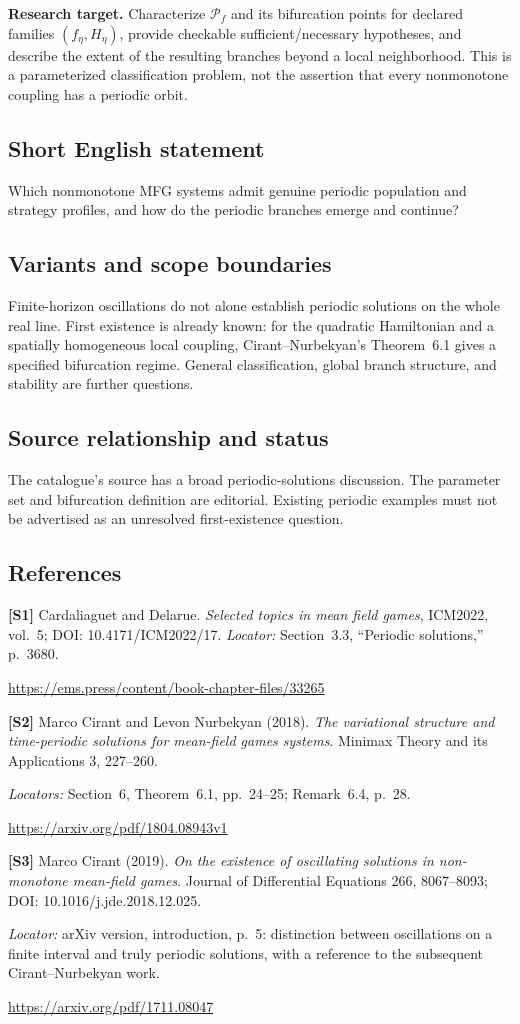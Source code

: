 \documentclass[11pt,a4paper]{article}
\begin{document}
\textbf{Research target.} Characterize $\mathcal P_f$ and its bifurcation points for declared families $(f_\eta,H_\eta)$, provide checkable sufficient/necessary hypotheses, and describe the extent of the resulting branches beyond a local neighborhood. This is a parameterized classification problem, not the assertion that every nonmonotone coupling has a periodic orbit.
\subsection*{Short English statement}
Which nonmonotone MFG systems admit genuine periodic population and strategy profiles, and how do the periodic branches emerge and continue?
\subsection*{Variants and scope boundaries}
Finite-horizon oscillations do not alone establish periodic solutions on the whole real line. First existence is already known: for the quadratic Hamiltonian and a spatially homogeneous local coupling, Cirant--Nurbekyan's Theorem~6.1 gives a specified bifurcation regime. General classification, global branch structure, and stability are further questions.
\subsection*{Source relationship and status}
The catalogue's source has a broad periodic-solutions discussion. The parameter set and bifurcation definition are editorial. Existing periodic examples must not be advertised as an unresolved first-existence question.
\subsection*{References}
\begingroup\footnotesize\raggedright
{\footnotesize\raggedright
\textbf{[S1]} Cardaliaguet and Delarue. \emph{Selected topics in mean field games}, ICM2022, vol.~5; DOI: 10.4171/ICM2022/17. \textit{Locator:} Section~3.3, ``Periodic solutions,'' p.~3680.\par
\url{https://ems.press/content/book-chapter-files/33265}\par\smallskip
\textbf{[S2]} Marco Cirant and Levon Nurbekyan (2018). \emph{The variational structure and time-periodic solutions for mean-field games systems}. Minimax Theory and its Applications 3, 227--260.\par
\textit{Locators:} Section~6, Theorem~6.1, pp.~24--25; Remark~6.4, p.~28.\par
\url{https://arxiv.org/pdf/1804.08943v1}\par\smallskip
\textbf{[S3]} Marco Cirant (2019). \emph{On the existence of oscillating solutions in non-monotone mean-field games}. Journal of Differential Equations 266, 8067--8093; DOI: 10.1016/j.jde.2018.12.025.\par
\textit{Locator:} arXiv version, introduction, p.~5: distinction between oscillations on a finite interval and truly periodic solutions, with a reference to the subsequent Cirant--Nurbekyan work.\par
\url{https://arxiv.org/pdf/1711.08047}\par}
\end{document}
